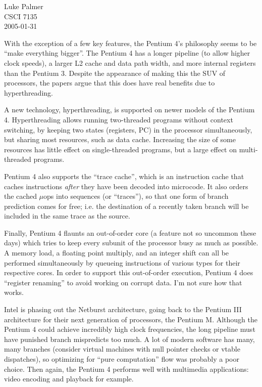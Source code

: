 \documentclass[12pt]{article}
\begin{document}
\noindent
Luke Palmer \\
CSCI 7135 \\
2005-01-31

With the exception of a few key features, the Pentium 4's philosophy
seems to be ``make everything bigger''.  The Pentium 4 has a longer
pipeline (to allow higher clock speeds), a larger L2 cache and data path
width, and more internal registers than the Pentium 3.  Despite the
appearance of making this the SUV of processors, the papers argue that
this does have real benefits due to hyperthreading.  

A new technology, hyperthreading, is supported on newer models of the
Pentium 4.  Hyperthreading allows running two-threaded programs without
context switching, by keeping two states (registers, PC) in the
processor simultaneously, but sharing most resources, such as data
cache.  Increasing the size of some resources has little effect on
single-threaded programs, but a large effect on multi-threaded programs.

Pentium 4 also supports the ``trace cache'', which is an instruction
cache that caches instructions \textit{after} they have been decoded
into microcode.  It also orders the cached $\mu$ops into sequences (or
``traces''), so that one form of branch prediction comes for free; i.e.
the destination of a recently taken branch will be included in the same
trace as the source.

Finally, Pentium 4 flaunts an out-of-order core (a feature not so
uncommon these days) which tries to keep every subunit of the processor
busy as much as possible.  A memory load, a floating point multiply, and
an integer shift can all be performed simultaneously by queueing
instructions of various types for their respective cores.  In order to
support this out-of-order execution, Pentium 4 does ``register
renaming'' to avoid working on corrupt data.  I'm not sure how that
works.

Intel is phasing out the Netburst architecture, going back to the
Pentium III architecture for their next generation of processors, the
Pentium M.  Although the Pentium 4 could achieve incredibly high clock
frequencies, the long pipeline must have punished branch mispredicts too
much.  A lot of modern software has many, many branches (consider
virtual machines with null pointer checks or vtable dispatches), so
optimizing for ``pure computation'' flow was probably a poor choice.
Then again, the Pentium 4 performs well with multimedia applications:
video encoding and playback for example.
\end{document}
